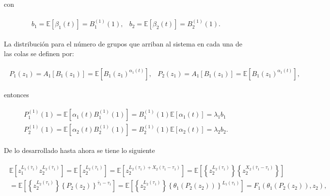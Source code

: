 \documentclass{article}
\newcommand{\esp}{\mathbb{E}}
\numberwithin{equation}{section}
\begin{document}
con

\begin{eqnarray}
\begin{array}{cc}
b_{1}=\esp\left[\beta_{1}\left(t\right)\right]=B_{1}^{(1)}\left(1\right),&
b_{2}=\esp\left[\beta_{2}\left(t\right)\right]=B_{2}^{(1)}\left(1\right).
\end{array}
\end{eqnarray}

La distribuci\'on para el n\'umero de grupos que arriban al sistema en cada una de las colas se definen por:

\begin{eqnarray}
\begin{array}{cc}
P_{1}\left(z_{1}\right)=A_{1}\left[B_{1}\left(z_{1}\right)\right]=\esp\left[B_{1}\left(z_{1}\right)^{\alpha_{1}\left(t\right)}\right],& P_{2}\left(z_{1}\right)=A_{1}\left[B_{1}\left(z_{1}\right)\right]=\esp\left[B_{1}\left(z_{1}\right)^{\alpha_{1}\left(t\right)}\right],
\end{array}
\end{eqnarray}

entonces

\begin{eqnarray}
\begin{array}{l}
P_{1}^{(1)}\left(1\right)=\esp\left[\alpha_{1}\left(t\right)B_{1}^{(1)}\left(1\right)\right]=B_{1}^{(1)}\left(1\right)\esp\left[\alpha_{1}\left(t\right)\right]=\lambda_{1}b_{1}\\
P_{2}^{(1)}\left(1\right)=\esp\left[\alpha_{2}\left(t\right)B_{2}^{(1)}\left(1\right)\right]=B_{2}^{(1)}\left(1\right)\esp\left[\alpha_{2}\left(t\right)\right]=\lambda_{2}b_{2}.
\end{array}
\end{eqnarray}

De lo desarrollado hasta ahora se tiene lo siguiente

\begin{eqnarray*}
\begin{array}{l}
\esp\left[z_{1}^{L_{1}\left(\overline{\tau}_{1}\right)}z_{2}^{L_{2}\left(\overline{\tau}_{1}\right)}\right]=\esp\left[z_{2}^{L_{2}\left(\overline{\tau}_{1}\right)}\right]=\esp\left[z_{2}^{L_{2}\left(\tau_{1}\right)+X_{2}\left(\overline{\tau}_{1}-\tau_{1}\right)}\right]=\esp\left[\left\{z_{2}^{L_{2}\left(\tau_{1}\right)}\right\}\left\{z_{2}^{X_{2}\left(\overline{\tau}_{1}-\tau_{1}\right)}\right\}\right]\\
=\esp\left[\left\{z_{2}^{L_{2}\left(\tau_{1}\right)}\right\}\left\{P_{2}\left(z_{2}\right)\right\}^{\overline{\tau}_{1}-\tau_{1}}\right]=\esp\left[\left\{z_{2}^{L_{2}\left(\tau_{1}\right)}\right\}\left\{\theta_{1}\left(P_{2}\left(z_{2}\right)\right)\right\}^{L_{1}\left(\tau_{1}\right)}\right]=F_{1}\left(\theta_{1}\left(P_{2}\left(z_{2}\right)\right),z_{2}\right),
\end{array}
\end{eqnarray*}
\end{document}
